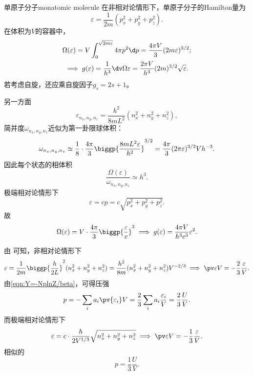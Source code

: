 \begin{example}{单原子分子}{monatomic molecule}
	在非相对论情形下，单原子分子的Hamilton量为
	\[
		\varepsilon=\frac1{2m}(p_x^2+p_y^2+p_z^2).
	\]
	在体积为$V$的容器中，
	\begin{gather}\notag
		\Omega(\varepsilon)=V\int_0^{\sqrt{2m\varepsilon}}4\pi p^2\d p=\frac{4\pi V}3(2m\varepsilon)^{3/2};\\
		\implies
		g(\varepsilon)=\frac1{h^3}\dv\Omega\varepsilon=\frac{2\pi V}{h^3}(2m)^{3/2}\sqrt\varepsilon.
	\end{gather}
	若考虑自旋，还应乘自旋因子$g_s=2s+1$。

	另一方面
	\[
		\varepsilon_{n_x,n_y,n_z}=\frac{h^2}{8mL^2}(n_x^2+n_y^2+n_z^2),
	\]
	简并度$\omega_{n_x,n_y,n_z}$近似为第一卦限球体积：
	\[
		\omega_{n_x,n_y,n_z}\simeq\frac18\cdot\frac{4\pi}3\biggp{\frac{8mL^2\varepsilon}{h^2}}^{3/2}=\frac{4\pi}{3}(2\pi\varepsilon)^{3/2}Vh^{-3}.
	\]
	因此每个状态的相体积
	\[
		\frac{\Omega(\varepsilon)}{\omega_{n_x,n_y,n_z}}\simeq h^3.
	\]
	\tcblower
	极端相对论情形下
	\[
		\varepsilon=cp=c\sqrt{p_x^2+p_y^2+p_z^2}.
	\]
	故
	\begin{equation}
		\Omega(\varepsilon)=V\cdot\frac{4\pi}3\biggp{\frac\varepsilon{c}}^3
		\implies
		g(\varepsilon)=\frac{4\pi V}{h^3c^3}\varepsilon^2.
	\end{equation}
\end{example}
\begin{corollary}
	由 可知，非相对论情形下
	\[
		\varepsilon=\frac1{2m}\biggp{\frac h{2L}}^2(n_x^2+n_y^2+n_z^2)=\frac{h^2}{8m}(n_x^2+n_y^2+n_z^2)V^{-2/3}
		\implies
		\pv\varepsilon V=-\frac23\frac\varepsilon V.
	\]
	由\eqref{eqn:Y=-NplnZ/beta}，可得压强
	\begin{equation}
		p=-\sum_i a_i\pv{\varepsilon_i}V=\frac23\sum_i a_i\frac{\varepsilon_i}V=\frac23\frac UV.
	\end{equation}
	而极端相对论情形下
	\[
		\varepsilon=c\cdot\frac h{2V^{1/3}}\sqrt{n_x^2+n_y^2+n_z^2}
		\implies
		\pv\varepsilon V=-\frac13\frac\varepsilon V.
	\]
	相似的
	\begin{equation}
		p=\frac13\frac UV.
	\end{equation}
\end{corollary}